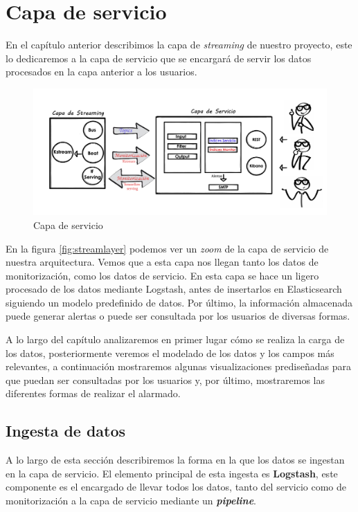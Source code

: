 \chapter{Capa de servicio}
\label{chapter:servicio}

En el capítulo anterior describimos la capa de \textit{streaming} de nuestro proyecto, este lo dedicaremos a la capa de servicio que se encargará de servir los datos procesados en la capa anterior a los usuarios.


\begin{figure}[!ht]
	\centering
	\includegraphics[width=1\textwidth]{images/serv/servicelayer_v1}
	\caption{Capa de servicio}
	\label{fig:servicelayer}
\end{figure}


En la figura \ref{fig:streamlayer} podemos ver un \textit{zoom} de la capa de servicio de nuestra arquitectura. Vemos que a esta capa nos llegan tanto los datos de monitorización, como los datos de servicio. En esta capa se hace un ligero procesado de los datos mediante Logstash, antes de insertarlos en Elasticsearch siguiendo un modelo predefinido de datos. Por último, la información almacenada puede generar alertas o puede ser consultada por los usuarios de diversas formas.

A lo largo del capítulo analizaremos en primer lugar cómo se realiza la carga de los datos, posteriormente veremos el modelado de los datos y los campos más relevantes, a continuación mostraremos algunas visualizaciones prediseñadas para que puedan ser consultadas por los usuarios y, por último, mostraremos las diferentes formas de realizar el alarmado.


\section{Ingesta de datos}
A lo largo de esta sección describiremos la forma en la que los datos se ingestan en la capa de servicio. El elemento principal de esta ingesta es \textbf{Logstash}, este componente es el encargado de llevar todos los datos, tanto del servicio como de monitorización a la capa de servicio mediante un \textit{\textbf{pipeline}}. 

